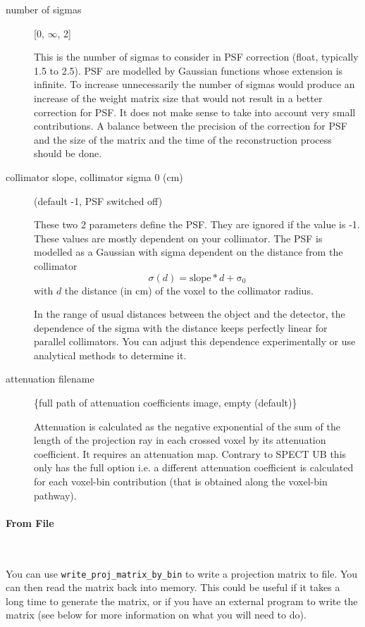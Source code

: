 \documentclass{article}
\newcommand{\subsubsubsection}[1]{\paragraph{#1}\mbox{} \\}
\begin{document}
{{{{{{\begin{description}
\item[ number of sigmas] [0, $\infty$, 2{]}

This is the number of sigmas to consider in PSF correction (float, typically 1.5 to 2.5). PSF are modelled by Gaussian functions whose extension is infinite. To increase unnecessarily the number of sigmas would produce an increase of the weight matrix size that would not result in a better correction for PSF. It does not make sense to take into account very small contributions. A balance between the precision of the correction for PSF and the size of the matrix and the time of the reconstruction process should be done.

\item[collimator slope, collimator sigma 0 (cm)] (default -1, PSF switched off)

These two 2 parameters define the PSF. They are ignored if the value is -1. These values are mostly dependent on your collimator. The PSF is modelled as a Gaussian with sigma dependent on the distance from the collimator
\begin{equation}
 \sigma(d) = \mathrm{slope} * d + \mathrm{\sigma_0}
\end{equation} 
\noindent with $d$ the distance (in cm) of the voxel to the collimator radius.

In the range of usual distances between the object and the detector, the dependence of the sigma with the distance keeps perfectly linear for parallel collimators. You can adjust this dependence experimentally or use analytical methods to determine it.

\item[attenuation filename] \{full path of attenuation coefficients image, empty (default)\}

Attenuation is calculated as the negative exponential of the sum of the length of the projection ray in each crossed voxel by its attenuation coefficient. It requires an attenuation map. Contrary to SPECT UB this only has the full option i.e. a different attenuation coefficient is calculated for each voxel-bin contribution (that is obtained along the voxel-bin pathway). 
\end{description}

{ \subsubsubsection{From File} }
\label{sec:projmatrixfromfile}
You can use \texttt{write\_proj\_matrix\_by\_bin} to write a projection matrix to file. You can
then read the matrix back into memory. This
could be useful if it takes a long time to generate the matrix, or if you have an external program
to write the matrix (see below for more information on what you will need to do).


}}}}}}
\end{document}
